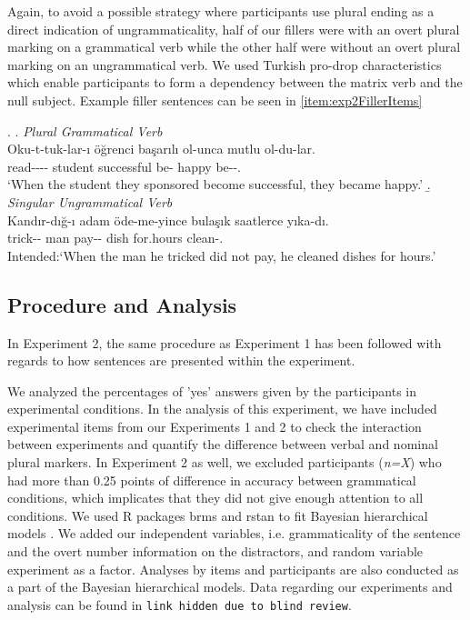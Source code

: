 \documentclass[doc,a4paper,man,natbib,floatsintext,noextraspace]{apa6}\usepackage[]{graphicx}\usepackage[]{color}
\begin{document}
Again, to avoid a possible strategy where participants use plural ending as a direct indication of ungrammaticality, half of our fillers were with an overt plural marking on a grammatical verb while the other half were without an overt plural marking on an ungrammatical verb. We used Turkish pro-drop characteristics which enable participants to form a dependency between the matrix verb and the null subject. Example filler sentences can be seen in \ref{item:exp2FillerItems} 

\ex. \label{item:exp2FillerItems}
\a. \textit{Plural Grammatical Verb}\\ 
\gll Oku-t-tuk-lar-ı öğrenci başarılı ol-unca mutlu ol-du-lar.\\ 
read-\Caus{}-\Nmlz{}-\Pl{}-\Poss{}  student successful be-\Nmlz{} happy be-\Pst{}-\Pl{}.\\
\glt `When the student they sponsored become successful, they became happy.' 
\b. \textit{Singular Ungrammatical Verb}\\ 
\gll *Kandır-dığ-ı adam öde-me-yince bulaşık saatlerce yıka-dı.\\ 
trick-\Nmlz{}-\Poss{}  man pay-\Neg{}-\Nmlz{} dish for.hours clean-\Pst{}.\\
\glt Intended:`When the man he tricked did not pay, he cleaned dishes for hours.'


\subsection{Procedure and Analysis} \label{sec:exp2:procedure_analysis}

In Experiment 2, the same procedure as Experiment 1 has been followed with regards to how sentences are presented within the experiment. 

We analyzed the percentages of 'yes' answers given by the participants in experimental conditions. In the analysis of this experiment, we have included experimental items from our Experiments 1 and 2 to check the interaction between experiments and quantify the difference between verbal and nominal plural markers. In Experiment 2 as well, we excluded participants (\textit{n=X}) who had more than 0.25 points of difference in accuracy between grammatical conditions, which implicates that they did not give enough attention to all conditions. We used R packages brms \citep{R-brms_b} and rstan \citep{R-stan} to fit Bayesian hierarchical models \citep{GelmanHill:2007}. We added our independent variables, i.e. grammaticality of the sentence and the overt number information on the distractors, and random variable experiment as a factor. Analyses by items and participants are also conducted as a 
part of the Bayesian hierarchical models. Data regarding our experiments and analysis can be found in \texttt{link hidden due to blind review}.
\end{document}
